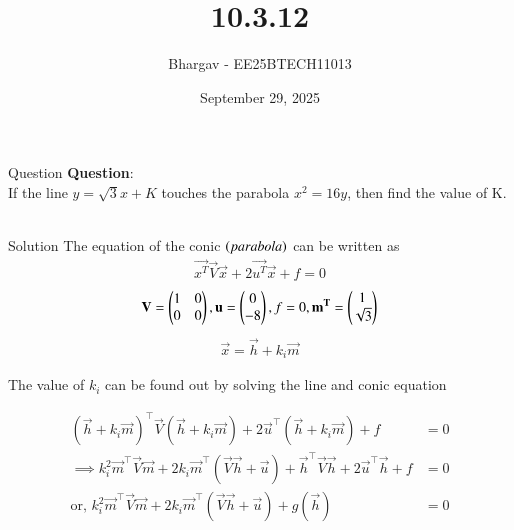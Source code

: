 \documentclass{beamer}
\title{10.3.12}
\date{September 29, 2025}
\author{Bhargav - EE25BTECH11013}
\begin{document}
\frame{\titlepage}

\begin{frame}{Question}
\textbf{Question}: \\
If the line $y = \sqrt{3}x + K$ touches the parabola $x^2 = 16y$, then find the value of K.\\ \\
\end{frame}
\begin{frame}{Solution}
The equation of the conic $\left(parabola\right)$ can be written as
\begin{align}
\vec{x^T}\vec{V}\vec{x} + 2\vec{u^T}\vec{x} + f = 0
\end{align}
\begin{align}
\mathbf{V} = \begin{pmatrix}1 & 0 \\ 0 & 0\end{pmatrix}, \mathbf{u} = \begin{pmatrix}0 \\ -8\end{pmatrix}, f=0, \mathbf{m^T} = \begin{pmatrix}1 \\ \sqrt{3}\end{pmatrix}
\end{align}
\begin{align}
\vec{x} = \vec{h} + k_i\vec{m}    
\end{align}

The value of $k_i$ can be found out by solving the line and conic equation

\begin{align}
(\vec{h} + k_i \vec{m})^{\top} \vec{V} (\vec{h} + k_i \vec{m}) + 2\vec{u}^{\top} (\vec{h} + k_i \vec{m}) + f &= 0 \\
\implies k_i^{2} \vec{m}^{\top}\vec{V}\vec{m} + 2k_i \vec{m}^{\top} (\vec{V}\vec{h} + \vec{u}) + \vec{h}^{\top}\vec{V}\vec{h} + 2\vec{u}^{\top}\vec{h} + f &= 0 \\
\text{or, } k_i^{2} \vec{m}^{\top}\vec{V}\vec{m} + 2k_i \vec{m}^{\top} (\vec{V}\vec{h} + \vec{u}) + g(\vec{h}) &= 0
\end{align}



\end{frame}
\end{document}
